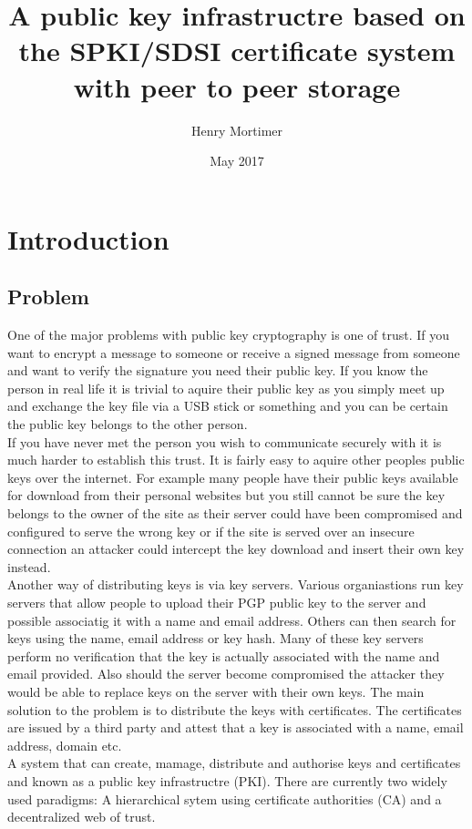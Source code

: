 \documentclass[12pt, a4paper]{article}
\begin{document}
\title{A public key infrastructre based on the SPKI/SDSI certificate system with peer to peer storage}
\author{Henry Mortimer}
\date{May 2017}
\maketitle

\tableofcontents
\clearpage

\section{Introduction}

\subsection{Problem}
One of the major problems with public key cryptography is one of trust. If you want to encrypt a message to someone or receive a signed message from someone and want to verify the signature you need their public key. If you know the person in real life it is trivial to aquire their public key as you simply meet up and exchange the key file via a USB stick or something and you can be certain the public key belongs to the other person. \\ 
If you have never met the person you wish to communicate securely with it is much harder to establish this trust. It is fairly easy to aquire other peoples public keys over the internet. For example many people have their public keys available for download from their personal websites but you still cannot be sure the key belongs to the owner of the site as their server could have been compromised and configured to serve the wrong key or if the site is served over an insecure connection an attacker could intercept the key download and insert their own key instead.\\
Another way of distributing keys is via key servers. Various organiastions run key servers that allow people to upload their PGP public key to the server and possible associatig it with a name and email address. Others can then search for keys using the name, email address or key hash. Many of these key servers perform no verification that the key is actually associated with the name and email provided. Also should the server become compromised the attacker they would be able to replace keys on the server with their own keys.
The main solution to the problem is to distribute the keys with certificates. The certificates are issued by a third party and attest that a key is associated with a name, email address, domain etc.\\
A system that can create, mamage, distribute and authorise keys and certificates and known as a public key infrastructre (PKI). There are currently two widely used paradigms: A hierarchical sytem using certificate authorities (CA) and a decentralized web of trust.
\end{document}
